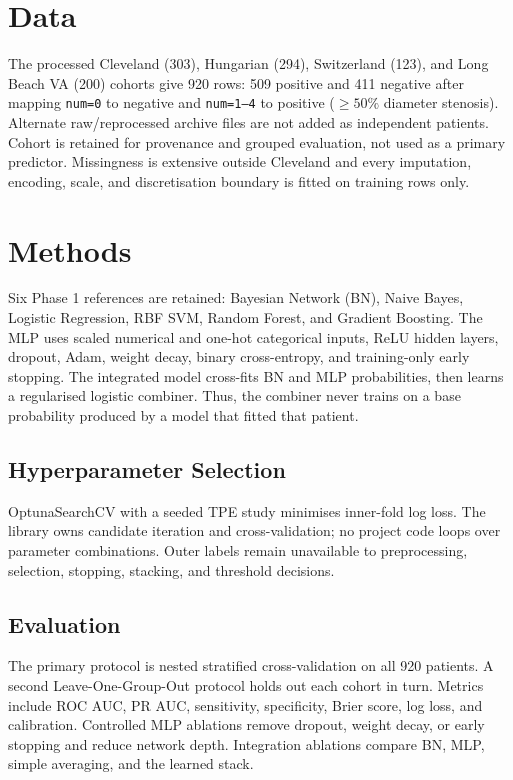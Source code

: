 \documentclass[conference]{IEEEtran}
\begin{document}
\section{Data}
The processed Cleveland (303), Hungarian (294), Switzerland (123), and Long Beach VA (200) cohorts give 920 rows: 509 positive and 411 negative after mapping \texttt{num=0} to negative and \texttt{num=1--4} to positive ($\ge 50\%$ diameter stenosis). Alternate raw/reprocessed archive files are not added as independent patients. Cohort is retained for provenance and grouped evaluation, not used as a primary predictor. Missingness is extensive outside Cleveland and every imputation, encoding, scale, and discretisation boundary is fitted on training rows only.

\section{Methods}
Six Phase 1 references are retained: Bayesian Network (BN), Naive Bayes, Logistic Regression, RBF SVM, Random Forest, and Gradient Boosting. The MLP uses scaled numerical and one-hot categorical inputs, ReLU hidden layers, dropout, Adam, weight decay, binary cross-entropy, and training-only early stopping. The integrated model cross-fits BN and MLP probabilities, then learns a regularised logistic combiner. Thus, the combiner never trains on a base probability produced by a model that fitted that patient.

\subsection{Hyperparameter Selection}
OptunaSearchCV with a seeded TPE study minimises inner-fold log loss. The library owns candidate iteration and cross-validation; no project code loops over parameter combinations. Outer labels remain unavailable to preprocessing, selection, stopping, stacking, and threshold decisions.

\subsection{Evaluation}
The primary protocol is nested stratified cross-validation on all 920 patients. A second Leave-One-Group-Out protocol holds out each cohort in turn. Metrics include ROC AUC, PR AUC, sensitivity, specificity, Brier score, log loss, and calibration. Controlled MLP ablations remove dropout, weight decay, or early stopping and reduce network depth. Integration ablations compare BN, MLP, simple averaging, and the learned stack.
\end{document}
